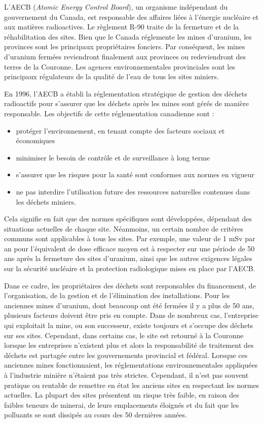 \documentclass{article}
\begin{document}
L'AECB (\textit{Atomic Energy Control Board}), un organisme indépendant du gouvernement du Canada, est responsable des affaires liées à l'énergie nucléaire et aux matières radioactives. Le règlement R-90 traite de la fermeture et de la réhabilitation des sites. Bien que le Canada réglemente les mines d'uranium, les provinces sont les principaux propriétaires fonciers. Par conséquent, les mines d'uranium fermées reviendront finalement aux provinces ou redeviendront des terres de la Couronne. Les agences environnementales provinciales sont les principaux régulateurs de la qualité de l'eau de tous les sites miniers.

En 1996, l'AECB a établi la réglementation stratégique de gestion des déchets radioactifs pour s'assurer que les déchets après les mines sont gérés de manière responsable. Les objectifs de cette réglementation canadienne sont :
\begin{itemize}
    \item protéger l'environnement, en tenant compte des facteurs sociaux et économiques
    \item minimiser le besoin de contrôle et de surveillance à long terme
    \item s'assurer que les risques pour la santé sont conformes aux normes en vigueur 
    \item ne pas interdire l'utilisation future des ressources naturelles contenues dans les déchets miniers.
\end{itemize}

Cela signifie en fait que des normes spécifiques sont développées, dépendant des situations actuelles de chaque site. Néanmoins, un certain nombre de critères communs sont applicables à tous les sites. Par exemple, une valeur de 1 mSv par an pour l'équivalent de dose efficace moyen est à respecter sur une période de 50 ans après la fermeture des sites d'uranium, ainsi que les autres exigences légales sur la sécurité nucléaire et la protection radiologique mises en place par l'AECB.

Dans ce cadre, les propriétaires des déchets sont responsables du financement, de l'organisation, de la gestion et de l’élimination des installations. Pour les anciennes mines d'uranium, dont beaucoup ont été fermées il y a plus de 50 ans, plusieurs facteurs doivent être pris en compte. Dans de nombreux cas, l'entreprise qui exploitait la mine, ou son successeur, existe toujours et s'occupe des déchets sur ses sites. Cependant, dans certains cas, le site est retourné à la Couronne lorsque les entreprises n’existent plus et alors la responsabilité de traitement des déchets est partagée entre les gouvernements provincial et fédéral. Lorsque ces anciennes mines fonctionnaient, les réglementations environnementales appliquées à l'industrie minière n'étaient pas très strictes. Cependant, il n'est pas souvent pratique ou rentable de remettre en état les anciens sites en respectant les normes actuelles. La plupart des sites présentent un risque très faible, en raison des faibles teneurs de minerai, de leurs emplacements éloignés et du fait que les polluants se sont dissipés au cours des 50 dernières années.
\end{document}
